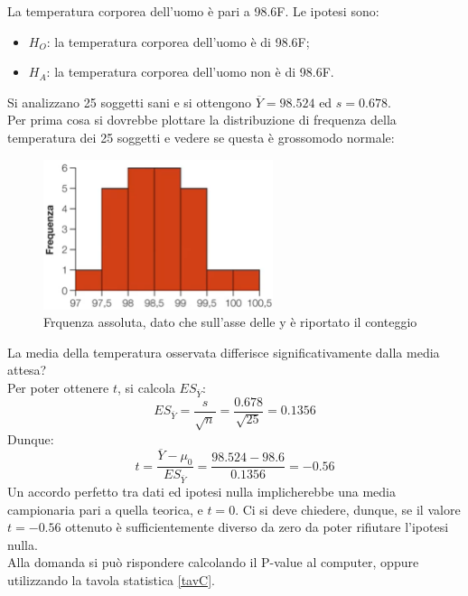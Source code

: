 \documentclass[10pt, draft]{book}
\newcounter{example}[section]
\begin{document}
\begin{example}
    La temperatura corporea dell'uomo è pari a 98.6\textdegree F.
    Le ipotesi sono:
    \begin{itemize}
        \item $H_O$: la temperatura corporea dell'uomo è di 98.6\textdegree F;
        \item $H_A$: la temperatura corporea dell'uomo non è di 98.6\textdegree F.
    \end{itemize}
    Si analizzano 25 soggetti sani e si ottengono $\overline{Y} = 98.524$ ed $s = 0.678$.
    \\
    Per prima cosa si dovrebbe plottare la distribuzione di frequenza della temperatura dei 25 soggetti e vedere se questa è grossomodo normale:
    \begin{figure}[H]\label{fig11.3-1}
        \centering
        \includegraphics[width=0.6\textwidth]{fig11.3-1}
        \caption{\small{Frquenza assoluta, dato che sull'asse delle y è riportato il conteggio}}
    \end{figure}
    La media della temperatura osservata differisce significativamente dalla media attesa?
    \\
    Per poter ottenere $t$, si calcola $ES_{\overline{Y}}$:
    \begin{equation}
        ES_{\overline{Y}} = \frac{s}{\sqrt{n}} = \frac{0.678}{\sqrt{25}} = 0.1356
    \end{equation}
    Dunque:
    \begin{equation}
        t = \frac{\overline{Y}-\mu_0}{ES_{\overline{Y}}} = \frac{98.524-98.6}{0.1356} = -0.56
    \end{equation}
    Un accordo perfetto tra dati ed ipotesi nulla implicherebbe una media campionaria pari a quella teorica, e $t=0$. Ci si deve chiedere, dunque, se il valore $t=-0.56$ ottenuto è sufficientemente diverso da zero da poter rifiutare l'ipotesi nulla.
    \\
    Alla domanda si può rispondere calcolando il P-value al computer, oppure utilizzando la tavola statistica \ref{tavC}.

\end{example}
\end{document}

